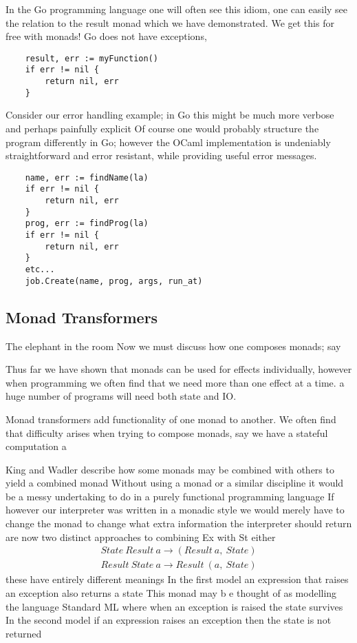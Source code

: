 In the Go programming language one will often see this idiom,
one can easily see the relation to the result monad which we
have demonstrated.
We get this for free with monads!
Go does not have exceptions,

\begin{verbatim}
    result, err := myFunction()
    if err != nil {
        return nil, err
    }
\end{verbatim}

Consider our error handling example;
in Go this might be much more verbose
and perhaps painfully explicit
Of course one would probably structure the program differently in Go;
however the OCaml implementation is undeniably straightforward
and error resistant, while providing useful error messages.

\begin{verbatim}
    name, err := findName(la)
    if err != nil {
        return nil, err
    }
    prog, err := findProg(la)
    if err != nil {
        return nil, err
    }
    etc...
    job.Create(name, prog, args, run_at)
\end{verbatim}

\subsection{Monad Transformers}
The elephant in the room
Now we must discuss how one composes monads;
say


Thus far we have shown that monads can be used for effects individually,
however when programming we often find that we need more than one effect
at a time. a huge number of programs will need both state
and IO.

Monad transformers add functionality of one monad to another.
We often find that difficulty arises when trying to compose monads,
say we have a stateful computation a

King and Wadler \cite{king1993combining}
describe how some monads may be combined with others to yield a combined monad
Without using a monad or a similar discipline it would be a messy undertaking
to do in a purely functional programming language
If however our interpreter was written in a monadic style we would merely have
to change the monad to change what extra information the interpreter should return
are now two distinct approaches to combining Ex with St either
\begin{align}
    State\ Result\ a \rightarrow (Result\ a,\ State)\\
    Result\ State\ a \rightarrow Result\ (a,\ State)
\end{align}
these have entirely different meanings
In the first model an expression that raises an exception also returns a state
This monad may b e thought of as modelling the language Standard ML where
when an exception is raised the state survives
In the second model if an expression raises an exception then
the state is not returned

